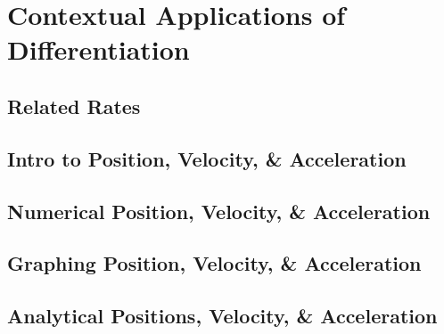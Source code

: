 \documentclass[../abcalc.tex]{subfiles}
\begin{document}
\chapter{Contextual Applications of Differentiation}
\section{Related Rates}
\section{Intro to Position, Velocity, \& Acceleration}
\section{Numerical Position, Velocity, \& Acceleration}
\section{Graphing Position, Velocity, \& Acceleration}
\section{Analytical Positions, Velocity, \& Acceleration}
\end{document}
